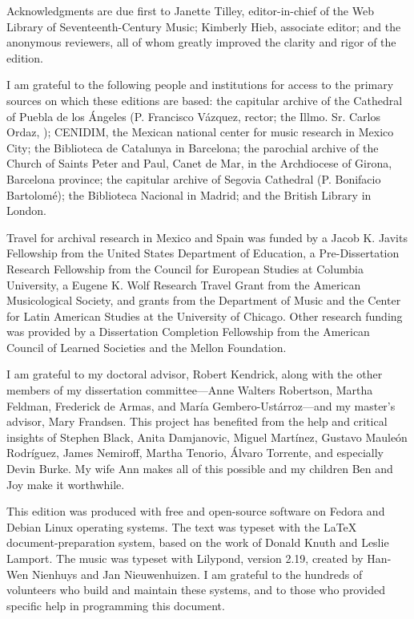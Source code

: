 Acknowledgments are due first to Janette Tilley, editor-in-chief of the Web
Library of Seventeenth-Century Music; Kimberly Hieb, associate editor; and the
anonymous reviewers, all of whom greatly improved the clarity and rigor of the
edition.

I am grateful to the following people and institutions for access to the 
primary sources on which these editions are based: 
the capitular archive of the Cathedral of Puebla de los Ángeles (P. Francisco 
Vázquez, rector; the Illmo. Sr. Carlos Ordaz, );
CENIDIM, the Mexican national center for music research in Mexico City;
the Biblioteca de Catalunya in Barcelona;
the parochial archive of the Church of Saints Peter and Paul, Canet de Mar, in 
the Archdiocese of Girona, Barcelona province;
the capitular archive of Segovia Cathedral (P. Bonifacio Bartolomé);
the Biblioteca Nacional in Madrid; and
the British Library in London.

Travel for archival research in Mexico and Spain was funded by 
a Jacob K. Javits Fellowship from the United States Department of Education, 
a Pre-Dissertation Research Fellowship from the Council for European Studies at 
Columbia University, 
a Eugene K. Wolf Research Travel Grant from the American Musicological Society, 
and grants from the Department of Music and the Center for Latin American 
Studies at the University of Chicago.
Other research funding was provided by a Dissertation Completion Fellowship 
from the American Council of Learned Societies and the Mellon Foundation.

I am grateful to my doctoral advisor, Robert Kendrick, along with the other
members of my dissertation committee---Anne Walters Robertson, Martha Feldman,
Frederick de Armas, and María Gembero-Ustárroz---and my master's advisor, Mary
Frandsen.
This project has benefited from the help and critical insights of 
Stephen Black,
Anita Damjanovic, 
Miguel Martínez, 
Gustavo Mauleón Rodríguez,
James Nemiroff, 
Martha Tenorio,
Álvaro Torrente, 
and especially Devin Burke.
My wife Ann makes all of this possible and my children Ben and Joy make it
worthwhile.


This edition was produced with free and open-source software on Fedora and
Debian Linux operating systems.
The text was typeset with the \LaTeX{} document-preparation system, based on 
the work of Donald Knuth and Leslie Lamport.
The music was typeset with Lilypond, version 2.19, created by Han-Wen Nienhuys
and Jan Nieuwenhuizen.
I am grateful to the hundreds of volunteers who build and maintain these 
systems, and to those who provided specific help in programming this document.

